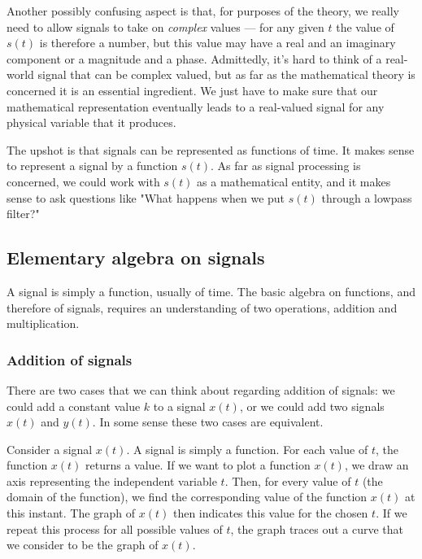 \documentclass[10pt]{beamer}
\begin{document}
Another possibly confusing aspect is that, for purposes of the theory, we really need to allow signals to take on {\em complex} values --- for any given $t$ the value of $s(t)$ is therefore a number, but this value may have a real and an imaginary component or a magnitude and a phase.  Admittedly, it's hard to think of a real-world signal that can be complex valued, but as far as the mathematical theory is concerned it is an essential ingredient.  We just have to make sure that our mathematical representation eventually leads to a real-valued signal for any physical variable that it produces.

The upshot is that signals can be represented as functions of time.  It makes sense to represent a signal by a function $s(t)$.  As far as signal processing is concerned, we could work with $s(t)$ as a mathematical entity, and it makes sense to ask questions like "What happens when we put $s(t)$ through a lowpass filter?"  

\subsection{Elementary algebra on signals}

A signal is simply a function, usually of time.  The basic algebra on functions, and therefore of signals, requires an understanding of two operations, addition and multiplication.  

\subsubsection{Addition of signals}

There are two cases that we can think about regarding addition of signals:  we could add a constant value $k$ to a signal $x(t)$, or we could add two signals $x(t)$ and $y(t)$.  In some sense these two cases are equivalent. 

Consider a signal $x(t)$.  A signal is simply a function.  For each value of $t$, the function $x(t)$ returns a value.  If we want to plot a function $x(t)$, we draw an axis representing the independent variable $t$.  Then, for every value of $t$ (the domain of the function), we find the corresponding value of the function $x(t)$ at this instant.  The graph of $x(t)$ then indicates this value for the chosen $t$.  If we repeat this process for all possible values of $t$, the graph traces out a curve that we consider to be the graph of $x(t)$.
\end{document}
